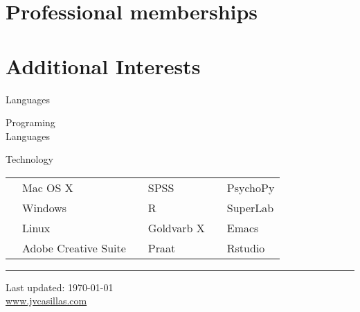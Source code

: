 \documentclass[12pt,letterpaper]{moderncv}
\begin{document}
\section{Professional memberships}






\section{Additional Interests}
{\color{UAred} Languages} \vspace{-.18in} \\


{\color{UAred} Programing\\ Languages} \vspace{-.37in} \\
\cventry{}{\LaTeX}{}{}{}{}
 

{\color{UAred} Technology} \\

\begin{tabular}{p{1.15in}lp{.7in}lp{1.1in}l}
   & Mac OS X             & & SPSS       & \phantom{.} & PsychoPy \\ [-2.5ex]
   & Windows              & & R          & \phantom{.} & SuperLab \\ [-2.5ex]
   & Linux                & & Goldvarb X & \phantom{.} & Emacs \\ [-2.5ex]
   & Adobe Creative Suite & & Praat      & \phantom{.} & Rstudio \\
\end{tabular}


\noindent \rule{490pt}{.5 mm}

\smallskip

\begin{center}
  \begin{footnotesize}
    Last updated: \today \\
    \href{http://www.jvcasillas.com}{www.jvcasillas.com}
  \end{footnotesize}
\end{center}


\end{document}
